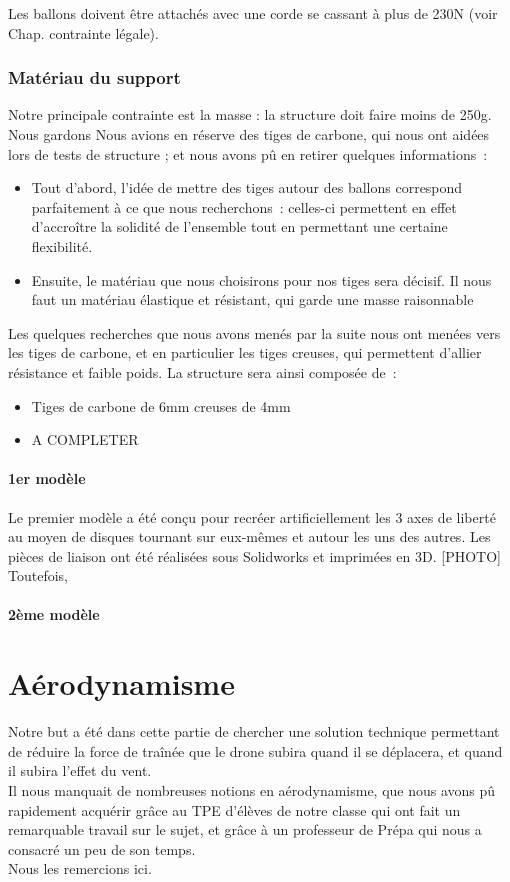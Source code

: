\documentclass[a4paper,11pt]{article}
\begin{document}
Les ballons doivent être attachés avec une corde se cassant à plus de 230N (voir Chap. contrainte légale).

\subsubsection{Matériau du support}
Notre principale contrainte est la masse : la structure doit faire moins de 250g. Nous gardons
Nous avions en réserve des tiges de carbone, qui nous ont aidées lors de tests de structure ; et nous avons pû en retirer quelques informations~:
\begin{itemize}
        \item Tout d'abord, l'idée de mettre des tiges autour des ballons correspond parfaitement à ce que nous recherchons~: celles-ci permettent en effet d'accroître la solidité de l'ensemble tout en permettant une certaine flexibilité.
        \item Ensuite, le matériau que nous choisirons pour nos tiges sera décisif. Il nous faut un matériau élastique et résistant, qui garde une masse raisonnable
\end{itemize}
Les quelques recherches que nous avons menés par la suite nous ont menées vers les tiges de carbone, et en particulier les tiges creuses, qui permettent d'allier résistance et faible poids.
La structure sera ainsi composée de~:
\begin{itemize}
        \item Tiges de carbone de 6mm creuses de 4mm
        \item A COMPLETER
\end{itemize}

\paragraph{1er modèle}

Le premier modèle a été conçu pour recréer artificiellement les 3 axes de liberté au moyen de disques tournant sur eux-mêmes et autour les uns des autres. Les pièces de liaison ont été réalisées sous Solidworks et imprimées en 3D.
[PHOTO]
Toutefois, 

\paragraph{2ème modèle}


\newpage

\section{Aérodynamisme}
	Notre but a été dans cette partie de chercher une solution technique permettant de réduire la force de traînée que le drone subira quand il se déplacera, et quand il subira l'effet du vent. \\
	Il nous manquait de nombreuses notions en aérodynamisme, que nous avons pû rapidement acquérir grâce au TPE d'élèves de notre classe qui ont fait un remarquable travail sur le sujet, et grâce à un professeur de Prépa qui nous a consacré un peu de son temps.\\
	Nous les remercions ici.
\end{document}
